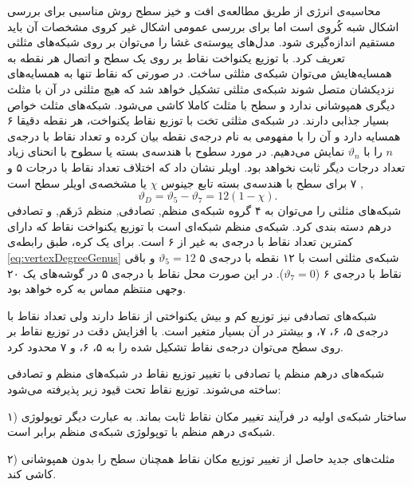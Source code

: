 محاسبه‌ی انرژی از طریق مطالعه‌ی افت و خیز سطح روش مناسبی برای بررسی اشکال شبه کُروی است اما برای بررسی عمومی اشکال غیر کروی مشخصات آن باید مستقیم اندازه‌گیری شود. مدل‌های پیوسته‌ی غشا را می‌توان بر روی شبکه‌های مثلثی تعریف کرد. با توزیع یکنواخت نقاط بر روی یک سطح و اتصال هر نقطه  به همسایه‌هایش می‌توان شبکه‌ی مثلثی ساخت. در صورتی که نقاط تنها به همسایه‌های نزدیکشان متصل شوند شبکه‌ی مثلثی تشکیل خواهد شد که هیچ مثلثی در آن با مثلث دیگری همپوشانی ندارد و سطح با مثلث کاملا کاشی می‌شود. شبکه‌های مثلث خواص بسیار جذابی دارند. در شبکه‌‌ی مثلثی تخت با توزیع نقاط یکنواخت، هر نقطه دقیقا ۶ همسایه دارد و آن را با مفهومی به نام درجه‌ی نقطه
بیان کرده و تعداد نقاط با درجه‌ی 
$n$
را با 
$\vartheta_n$
نمایش می‌دهیم. در مورد سطوح با هندسه‌ی بسته یا سطوح با انحنای زیاد تعداد درجات دیگر ثابت نخواهد بود. اویلر نشان داد که اختلاف تعداد  نقاط با درجات ۵ و ۷ برای سطح با هندسه‌ی بسته تابع جینوس
$\chi$
یا مشخصه‌ی اویلر سطح است
\cite{Nguyen2005PRE},
\begin{equation}
\vartheta_D=\vartheta_5-\vartheta_7=12(1-\chi).
\label{eq:vertexDegreeGenus}
\end{equation}
شبکه‌های مثلثی را می‌توان به ۴ گروه شبکه‌ی منظم,
 تصادفی,
 منظم دَرهَم,
 و تصادفی درهم
دسته بندی کرد. شبکه‌ی منظم شبکه‌ای است با توزیع یکنواخت نقاط که دارای کمترین تعداد نقاط با درجه‌ی به غیر از ۶ است. برای یک کره، طبق رابطه‌ی 
\ref{eq:vertexDegreeGenus}
شبکه‌ی مثلثی است با ۱۲ نقطه با درجه‌ی ۵
$\vartheta_5=12$
و باقی نقاط با درجه‌ی ۶ 
($\vartheta_7=0$).
 در این صورت محل نقاط با درجه‌ی ۵ در گوشه‌های یک ۲۰ وجهی منتظم
 مماس به کره خواهد بود.
 
 شبکه‌های تصادفی نیز توزیع کم و بیش یکنواختی از نقاط دارند ولی تعداد نقاط با درجه‌ی ۵، ۶، ۷،  و بیشتر در آن بسیار متغیر است. با افزایش دقت در توزیع نقاط بر روی سطح می‌توان درجه‌ی نقاط تشکیل شده را به ۵، ۶، و ۷ محدود کرد. 
 
شبکه‌های درهم منظم یا تصادفی با تغییر توزیع نقاط در شبکه‌های منظم و تصادفی ساخته می‌شوند. توزیع نقاط تحت قیود زیر  پذیرفته می‌شود:

۱) ساختار شبکه‌ی اولیه در فرآیند تغییر مکان نقاط ثابت بماند. به عبارت دیگر توپولوژی شبکه‌ی درهم منظم با توپولوژی شبکه‌ی منظم برابر است.

۲) مثلث‌های جدید حاصل از تغییر توزیع مکان نقاط همچنان سطح را بدون همپوشانی کاشی کند.

